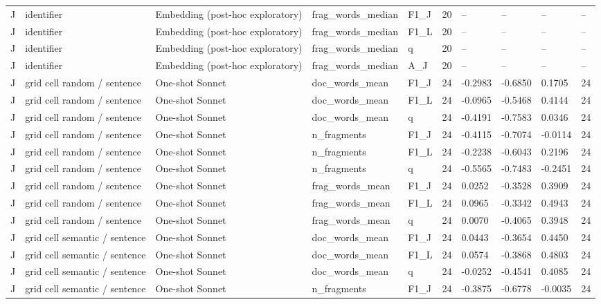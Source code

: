 \begin{table}[t]
{\begin{tabular}{llllllllll}
J & identifier & Embedding (post-hoc exploratory) & frag\_words\_median & F1\_J & 20 & -- & -- & -- & -- \\
J & identifier & Embedding (post-hoc exploratory) & frag\_words\_median & F1\_L & 20 & -- & -- & -- & -- \\
J & identifier & Embedding (post-hoc exploratory) & frag\_words\_median & q & 20 & -- & -- & -- & -- \\
J & identifier & Embedding (post-hoc exploratory) & frag\_words\_median & A\_J & 20 & -- & -- & -- & -- \\
J & grid cell random / sentence & One-shot Sonnet & doc\_words\_mean & F1\_J & 24 & -0.2983 & -0.6850 & 0.1705 & 24 \\
J & grid cell random / sentence & One-shot Sonnet & doc\_words\_mean & F1\_L & 24 & -0.0965 & -0.5468 & 0.4144 & 24 \\
J & grid cell random / sentence & One-shot Sonnet & doc\_words\_mean & q & 24 & -0.4191 & -0.7583 & 0.0346 & 24 \\
J & grid cell random / sentence & One-shot Sonnet & n\_fragments & F1\_J & 24 & -0.4115 & -0.7074 & -0.0114 & 24 \\
J & grid cell random / sentence & One-shot Sonnet & n\_fragments & F1\_L & 24 & -0.2238 & -0.6043 & 0.2196 & 24 \\
J & grid cell random / sentence & One-shot Sonnet & n\_fragments & q & 24 & -0.5565 & -0.7483 & -0.2451 & 24 \\
J & grid cell random / sentence & One-shot Sonnet & frag\_words\_mean & F1\_J & 24 & 0.0252 & -0.3528 & 0.3909 & 24 \\
J & grid cell random / sentence & One-shot Sonnet & frag\_words\_mean & F1\_L & 24 & 0.0965 & -0.3342 & 0.4943 & 24 \\
J & grid cell random / sentence & One-shot Sonnet & frag\_words\_mean & q & 24 & 0.0070 & -0.4065 & 0.3948 & 24 \\
J & grid cell semantic / sentence & One-shot Sonnet & doc\_words\_mean & F1\_J & 24 & 0.0443 & -0.3654 & 0.4450 & 24 \\
J & grid cell semantic / sentence & One-shot Sonnet & doc\_words\_mean & F1\_L & 24 & 0.0574 & -0.3868 & 0.4803 & 24 \\
J & grid cell semantic / sentence & One-shot Sonnet & doc\_words\_mean & q & 24 & -0.0252 & -0.4541 & 0.4085 & 24 \\
J & grid cell semantic / sentence & One-shot Sonnet & n\_fragments & F1\_J & 24 & -0.3875 & -0.6778 & -0.0035 & 24 \\

\end{tabular}}
\end{table}
